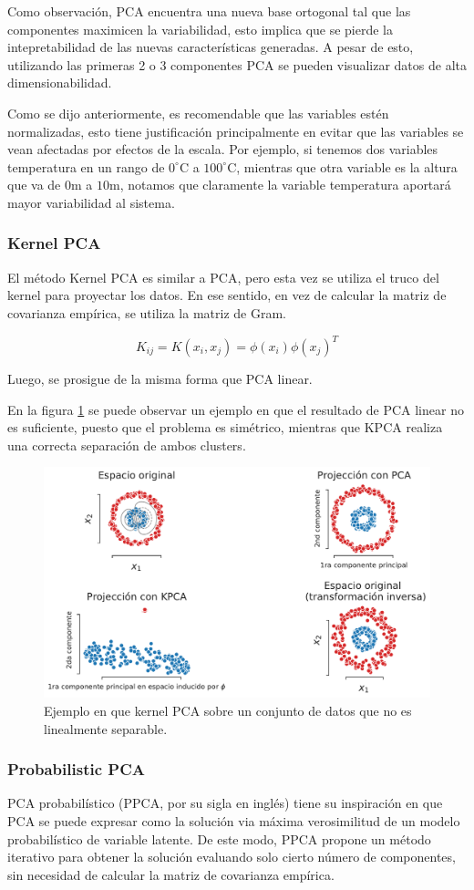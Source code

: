 Como observación, PCA encuentra una nueva base ortogonal tal que las componentes maximicen la variabilidad, esto implica que se pierde la intepretabilidad de las nuevas características generadas. A pesar de esto, utilizando las primeras 2 o 3 componentes PCA se pueden visualizar datos de alta dimensionabilidad.

Como se dijo anteriormente, es recomendable que las variables estén normalizadas, esto tiene justificación principalmente en evitar que las variables se vean afectadas por efectos de la escala. Por ejemplo, si tenemos dos variables temperatura en un rango de $0^\circ$C a $100^\circ$C, mientras que otra variable es la altura que va de $0$m a $10$m, notamos que claramente la variable temperatura aportará mayor variabilidad al sistema.
\subsubsection{Kernel PCA}
El método Kernel PCA es similar a PCA, pero esta vez se utiliza el truco del kernel para proyectar los datos. En ese sentido, en vez de calcular la matriz de covarianza empírica, se utiliza la matriz de Gram.

$$
K_{ij} = K(x_i,x_j) = \phi(x_i)\phi(x_j)^T
$$

Luego, se prosigue de la misma forma que PCA linear.

En la figura \ref{fig:kpca} se puede observar un ejemplo en que el resultado de PCA linear no es suficiente, puesto que el problema es simétrico, mientras que KPCA realiza una correcta separación de ambos clusters.

\begin{figure}[ht]
    \centering
    \includegraphics[width=0.7\linewidth]{img/cap7_kpca.pdf}
    \caption{Ejemplo en que kernel PCA sobre un conjunto de datos que no es linealmente separable.}
    \label{fig:kpca}
\end{figure}

\subsubsection{Probabilistic PCA}
PCA probabilístico (PPCA, por su sigla en inglés) tiene su inspiración en que PCA se puede expresar como la solución via máxima verosimilitud de un modelo probabilístico de variable latente. De este modo, PPCA propone un método iterativo para obtener la solución evaluando solo cierto número de componentes, sin necesidad de calcular la matriz de covarianza empírica.

